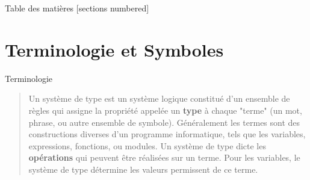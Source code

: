 \documentclass[10pt]{beamer}
\begin{document}
\begin{frame}{Table des matières}
  [sections numbered]
  \tableofcontents%
\end{frame}


\section{Terminologie et Symboles}

\begin{frame}{Terminologie}
  \begin{quote}
    Un \alert{système de type} est un système logique constitué d'un ensemble de règles qui assigne la propriété appelée un \textbf{type} à chaque "terme" (un mot, phrase, ou autre ensemble de symbole). Généralement les termes sont des constructions diverses d'un programme informatique, tels que les variables, expressions, fonctions, ou modules.
    Un système de type dicte les \textbf{opérations} qui peuvent être réalisées sur un terme. Pour les variables, le système de type détermine les valeurs permissent de ce terme.
    \cite{noauthor_type_2022}
  \end{quote}
\end{frame}
\end{document}
